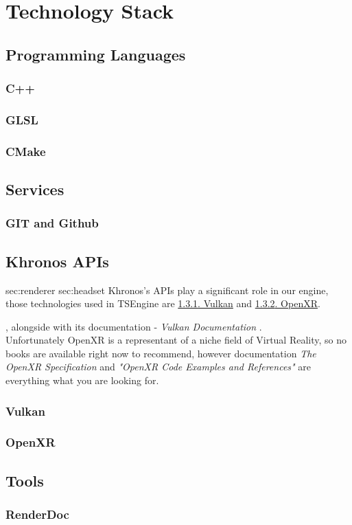 \newpage
\section{Technology Stack}
\hspace{\parindent}


\subsection{Programming Languages}
\subsubsection{C++}
\subsubsection{GLSL}
\label{sec:glsl}
\subsubsection{CMake}
\label{sec:stack_cmake}
\subsection{Services}
\subsubsection{GIT and Github}
\subsection{Khronos APIs}
\label{sec:khronos}
sec:renderer sec:headset
Khronos's APIs play a significant role in our engine, those technologies used in TSEngine are \hyperref[sec:stack_vk]{\ref*{sec:stack_vk}. Vulkan} and \hyperref[sec:stack_xr]{\ref*{sec:stack_xr}. OpenXR}. 


\cite{VulkanCookbook}, alongside with its documentation - \textit{Vulkan Documentation} \cite{VkDoc}.\\ Unfortunately OpenXR is a representant of a niche field of Virtual Reality, so no books are available right now to recommend, however documentation \textit{The OpenXR Specification} \cite{XrDoc} and \textit{"OpenXR Code Examples and References"} \cite{OpenXrExamples} are everything what you are looking for. %


\subsubsection{Vulkan}
\label{sec:stack_vk}
\subsubsection{OpenXR}
\label{sec:stack_xr}
\subsection{Tools}
\subsubsection{RenderDoc}
\label{sec:renderdoc}